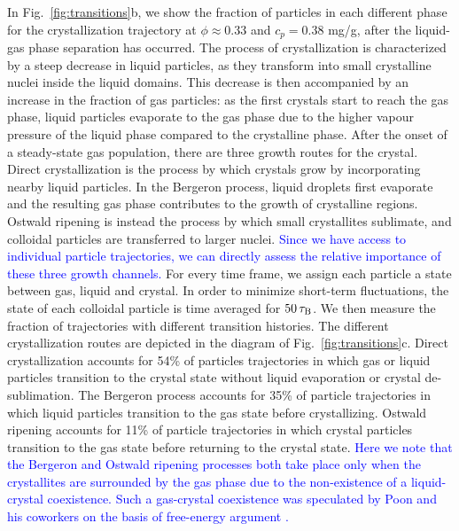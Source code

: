 \documentclass[preprint,amsmath,amssymb,superscriptaddress]{revtex4-1}
\begin{document}
In Fig.~\ref{fig:transitions}b, we show  the fraction of particles in each different phase for the crystallization trajectory at
$\phi\approx 0.33$ and $c_p=0.38$ mg/g, after the liquid-gas phase separation has occurred.
The process of crystallization is characterized 
by a steep decrease in liquid particles, as they transform into small crystalline nuclei inside the liquid domains. This decrease
is then accompanied by an increase in the fraction of gas particles: as the first crystals start to reach the gas phase, liquid particles evaporate 
to the gas phase due to the higher vapour pressure of the liquid phase compared to the crystalline phase. 
After the onset of a steady-state gas population, there are three growth routes for the crystal. 
Direct crystallization is the process by which crystals grow by incorporating nearby liquid particles. 
In the Bergeron process, liquid droplets first evaporate and the resulting gas phase contributes to the growth of crystalline regions. Ostwald ripening is instead the process by which small crystallites sublimate, and colloidal particles are transferred to larger nuclei.
\textcolor{blue}{Since we have access to individual particle trajectories, we can directly assess the relative importance of these three growth channels.}
For every time frame, we assign each particle a state between gas, liquid and crystal. In order to minimize short-term fluctuations, the state of each colloidal particle is time averaged for $50\,\tau_{\rm B}$. We then measure the fraction of trajectories with different transition histories.
The different crystallization routes are depicted in the diagram of Fig.~\ref{fig:transitions}c.
Direct crystallization accounts for 54\% of particles trajectories in which gas or liquid particles transition to the crystal state without liquid evaporation or crystal de-sublimation. 
The Bergeron process accounts for 35\% of particle trajectories in which liquid particles transition to the gas state before crystallizing. 
Ostwald ripening accounts for 11\% of particle trajectories in which crystal particles transition to the gas state before returning to the crystal state. \textcolor{blue}{Here we note that the Bergeron and Ostwald ripening processes both take place only when the crystallites are 
surrounded by the gas phase due to the non-existence of a liquid-crystal coexistence. Such a gas-crystal coexistence was speculated  by Poon and his coworkers on the basis of free-energy argument \cite{poon1999cpm,renth2001phase}.} 
 
\end{document}
